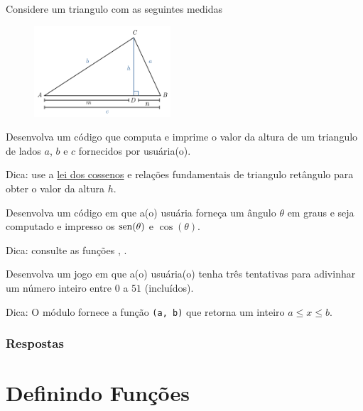 \begin{exer}
  Considere um triangulo com as seguintes medidas
  \begin{figure}[H]
    \centering
    \includegraphics[width=2in]{./cap_fun/dados/fig_leiDosCossenos/fig.png}
  \end{figure}
  Desenvolva um código que computa e imprime o valor da altura de um triangulo de lados $a$, $b$ e $c$ fornecidos por usuária(o).
\end{exer}
\begin{resp}
  Dica: use a \href{https://pt.wikipedia.org/wiki/Lei_dos_cossenos}{lei dos cossenos} e relações fundamentais de triangulo retângulo para obter o valor da altura $h$. 
\end{resp}

\begin{exer}
  Desenvolva um código em que a(o) usuária forneça um ângulo $\theta$ em graus e seja computado e impresso os $\operatorname{sen}(\theta)$ e $\cos(\theta)$.
\end{exer}
\begin{resp}
  Dica: consulte as funções {\PYTHONmathDOTsin}, {\PYTHONmathDOTcos}.
\end{resp}

\begin{exer}
  Desenvolva um jogo em que a(o) usuária(o) tenha três tentativas para adivinhar um número inteiro entre $0$ a $51$ (incluídos). 
\end{exer}
\begin{resp}
  Dica: O módulo {\PYTHONrandom} fornece a função {\PYTHONrandomDOTrandint}\texttt{(a, b)} que retorna um inteiro $a \leq x \leq b$.
\end{resp}

\ifisbook
\subsubsection{Respostas}
\shipoutAnswer
\fi

\section{Definindo Funções}\label{cap_fun_sec_def}

